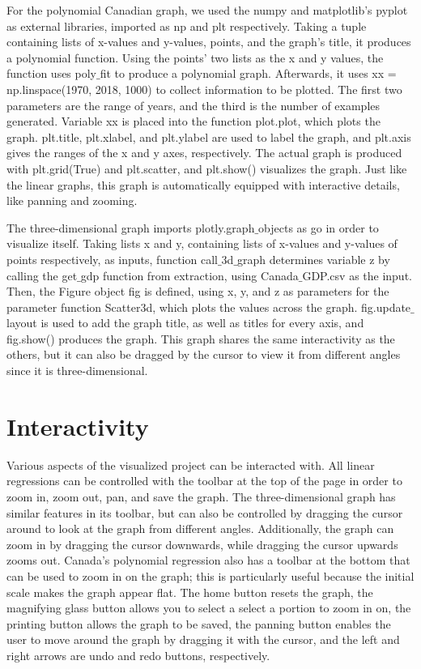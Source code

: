\documentclass[fontsize=11pt]{article}
\begin{document}
    For the polynomial Canadian graph, we used the numpy and matplotlib's pyplot as external libraries, imported as np and plt respectively. Taking a tuple containing lists of x-values and y-values, points, and the graph's title, it produces a polynomial function. Using the points' two lists as the x and y values, the function uses poly$\_$fit to produce a polynomial graph. Afterwards, it uses xx = np.linspace(1970, 2018, 1000) to collect information to be plotted. The first two parameters are the range of years, and the third is the number of examples generated. Variable xx is placed into the function plot.plot, which plots the graph. plt.title, plt.xlabel, and plt.ylabel are used to label the graph, and plt.axis gives the ranges of the x and y axes, respectively. The actual graph is produced with plt.grid(True) and plt.scatter, and plt.show() visualizes the graph. Just like the linear graphs, this graph is automatically equipped with interactive details, like panning and zooming.

    The three-dimensional graph imports plotly.graph$\_$objects as go in order to visualize itself. Taking lists x and y, containing lists of x-values and y-values of points respectively, as inputs, function call$\_$3d$\_$graph determines variable z by calling the get$\_$gdp function from extraction, using Canada$\_$GDP.csv as the input. Then, the Figure object fig is defined, using x, y, and z as parameters for the parameter function Scatter3d, which plots the values across the graph. fig.update$\_$layout is used to add the graph title, as well as titles for every axis, and fig.show() produces the graph. This graph shares the same interactivity as the others, but it can also be dragged by the cursor to view it from different angles since it is three-dimensional.


    \section*{Interactivity}
    Various aspects of the visualized project can be interacted with. All linear regressions can be controlled with the toolbar at the top of the page in order to zoom in, zoom out, pan, and save the graph. The three-dimensional graph has similar features in its toolbar, but can also be controlled by dragging the cursor around to look at the graph from different angles. Additionally, the graph can zoom in by dragging the cursor downwards, while dragging the cursor upwards zooms out. Canada's polynomial regression also has a toolbar at the bottom that can be used to zoom in on the graph; this is particularly useful because the initial scale makes the graph appear flat. The home button resets the graph, the magnifying glass button allows you to select a select a portion to zoom in on, the printing button allows the graph to be saved, the panning button enables the user to move around the graph by dragging it with the cursor, and the left and right arrows are undo and redo buttons, respectively.
\end{document}
